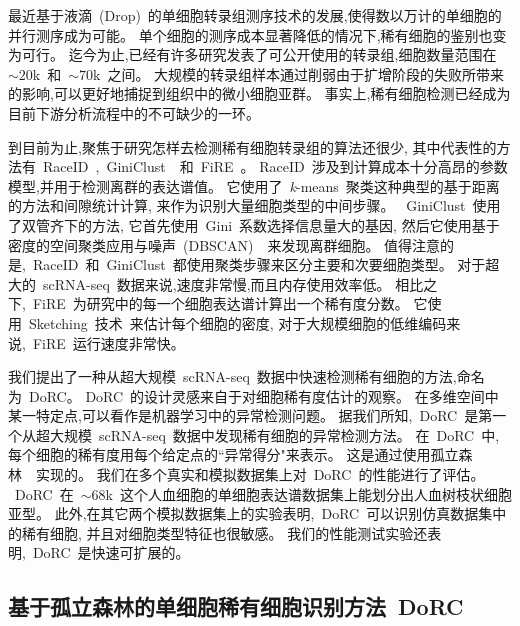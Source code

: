 最近基于液滴~(Drop)~的单细胞转录组测序技术的发展,使得数以万计的单细胞的并行测序成为可能。
单个细胞的测序成本显著降低的情况下,稀有细胞的鉴别也变为可行。
迄今为止,已经有许多研究发表了可公开使用的转录组,细胞数量范围在~${\sim} 20$k~和~${\sim} 70$k~之间。
大规模的转录组样本通过削弱由于扩增阶段的失败所带来的影响,可以更好地捕捉到组织中的微小细胞亚群。
事实上,稀有细胞检测已经成为目前下游分析流程中的不可缺少的一环。

到目前为止,聚焦于研究怎样去检测稀有细胞转录组的算法还很少,
其中代表性的方法有~RaceID~\cite{grun2015single},~GiniClust~\cite{jiang2016giniclust}~和~FiRE~\cite{jindal2018discovery}。
RaceID~涉及到计算成本十分高昂的参数模型,并用于检测离群的表达谱值。
它使用了~\textit{k}-means~聚类这种典型的基于距离的方法和间隙统计计算,
来作为识别大量细胞类型的中间步骤。
~GiniClust~使用了双管齐下的方法,
它首先使用~Gini~系数选择信息量大的基因,
然后它使用基于密度的空间聚类应用与噪声~(DBSCAN)~\cite{ester1996density}~来发现离群细胞。
值得注意的是,~RaceID~和~GiniClust~都使用聚类步骤来区分主要和次要细胞类型。
对于超大的~scRNA-seq~数据来说,速度非常慢,而且内存使用效率低。
相比之下,~FiRE~为研究中的每一个细胞表达谱计算出一个稀有度分数。
它使用~Sketching~技术~\cite{wang2007sizing}来估计每个细胞的密度,
对于大规模细胞的低维编码来说,~FiRE~运行速度非常快。

我们提出了一种从超大规模~scRNA-seq~数据中快速检测稀有细胞的方法,命名为~DoRC。
DoRC~的设计灵感来自于对细胞稀有度估计的观察。
在多维空间中某一特定点,可以看作是机器学习中的异常检测问题。
据我们所知,~DoRC~是第一个从超大规模~scRNA-seq~数据中发现稀有细胞的异常检测方法。
在~DoRC~中,每个细胞的稀有度用每个给定点的``异常得分"来表示。
这是通过使用孤立森林~\cite{liu2008isolation}~实现的。
我们在多个真实和模拟数据集上对~DoRC~的性能进行了评估。
~DoRC~在~${\sim}68$k~这个人血细胞的单细胞表达谱数据集上能划分出人血树枝状细胞亚型。
此外,在其它两个模拟数据集上的实验表明,~DoRC~可以识别仿真数据集中的稀有细胞,
并且对细胞类型特征也很敏感。
我们的性能测试实验还表明,~DoRC~是快速可扩展的。

\subsection{基于孤立森林的单细胞稀有细胞识别方法~DoRC}
\label{sec:method}

